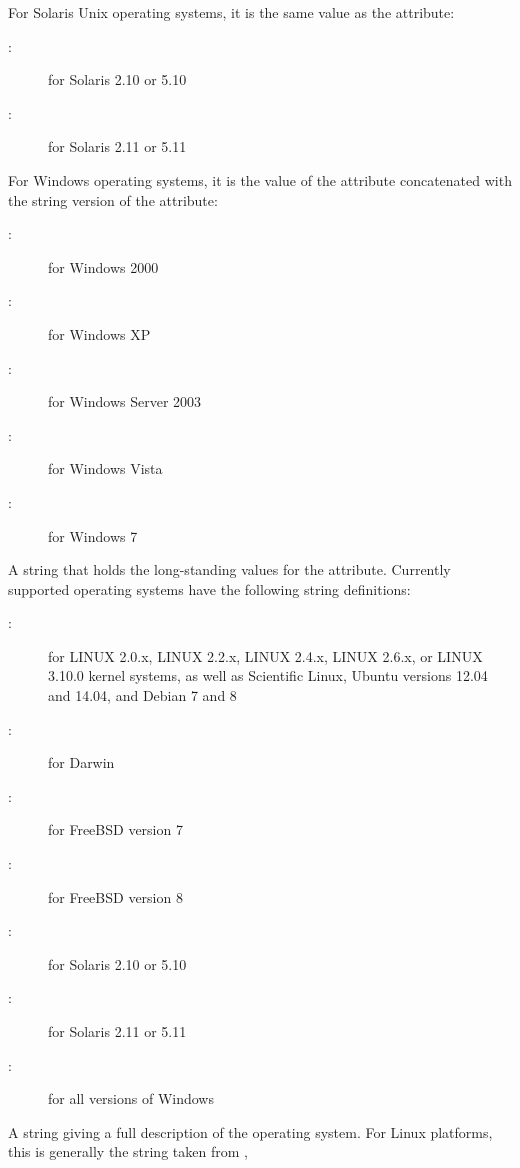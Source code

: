 \begin{description}
\begin{description}
	\end{description}
For Solaris Unix operating systems, 
it is the same value as the  attribute: 
	\begin{description}
	\item[:] for Solaris 2.10 or 5.10
	\item[:] for Solaris 2.11 or 5.11
	\end{description}
For Windows operating systems, it is the value of the  attribute 
concatenated with the string version of the  attribute:
	\begin{description}
	\item[:] for Windows 2000
	\item[:] for Windows XP
	\item[:] for Windows Server 2003
	\item[:] for Windows Vista
	\item[:] for Windows 7
	\end{description}
%
\item[\AdAttr{OpSysLegacy}:] A string that holds the long-standing values for the  attribute.
Currently supported operating systems have the following string
definitions:
	\begin{description}
	\item[:] for LINUX 2.0.x, LINUX 2.2.x, LINUX 2.4.x, 
        LINUX 2.6.x, or LINUX 3.10.0 kernel systems, 
        as well as Scientific Linux, 
        Ubuntu versions 12.04 and 14.04, 
        and Debian 7 and 8
	\item[:] for Darwin
	\item[:] for FreeBSD version 7
	\item[:] for FreeBSD version 8
	\item[:] for Solaris 2.10 or 5.10
	\item[:] for Solaris 2.11 or 5.11
	\item[:] for all versions of Windows
	\end{description}
%
\item[\AdAttr{OpSysLongName}:] A string giving a full description of 
the operating system.
For Linux platforms, this is generally the string taken from ,

\end{description}

